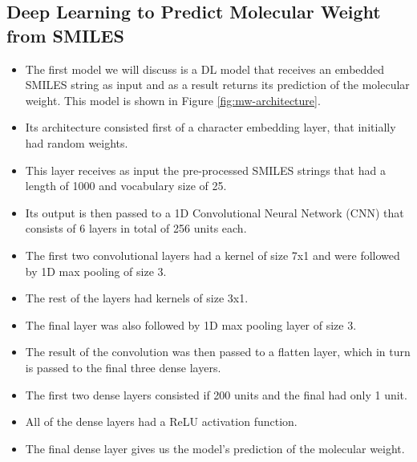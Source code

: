     \subsection{Deep Learning to Predict Molecular Weight from SMILES}
        \begin{itemize}
            \item The first model we will discuss is a DL model that receives an embedded SMILES string as input and as a result returns its prediction of the molecular weight. This model is shown in Figure \ref{fig:mw-architecture}.
            \item Its architecture consisted first of a character embedding layer, that initially had random weights.
            \item This layer receives as input the pre-processed SMILES strings that had a length of 1000 and vocabulary size of 25.
            \item Its output is then passed to a 1D Convolutional Neural Network (CNN) that consists of 6 layers in total of 256 units each.
            \item The first two convolutional layers had a kernel of size 7x1 and were followed by 1D max pooling of size 3.
            \item The rest of the layers had kernels of size 3x1.
            \item The final layer was also followed by 1D max pooling layer of size 3.
            \item The result of the convolution was then passed to a flatten layer, which in turn is passed to the final three dense layers. 
            \item The first two dense layers consisted if 200 units and the final had only 1 unit. 
            \item All of the dense layers had a ReLU activation function.
            \item The final dense layer gives us the model's prediction of the molecular weight.
        \end{itemize}
